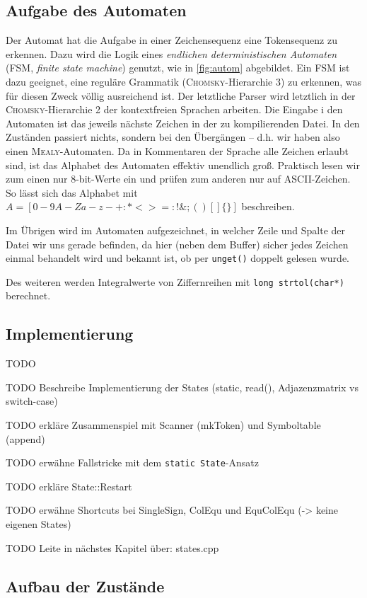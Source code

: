 \documentclass[
a4paper,   %
11pt,      %
oneside,   %
onecolumn, %
final      %
]{article}
\newcommand{\code}[1]{\lstinline$#1$}
\begin{document}
\subsection{Aufgabe des Automaten}
Der Automat hat die Aufgabe in einer Zeichensequenz eine Tokensequenz zu erkennen.
Dazu wird die Logik eines \emph{endlichen deterministischen Automaten} (FSM, \emph{finite state machine}) genutzt, wie in \ref{fig:autom} abgebildet.
Ein FSM ist dazu geeignet, eine reguläre Grammatik (\textsc{Chomsky}-Hierarchie 3) zu erkennen, was für diesen Zweck völlig ausreichend ist. Der letztliche Parser wird letztlich in der \textsc{Chomsky}-Hierarchie 2 der kontextfreien Sprachen arbeiten.
Die Eingabe i den Automaten ist das jeweils nächste Zeichen in der zu kompilierenden Datei.
In den Zuständen passiert nichts, sondern bei den Übergängen -- d.h. wir haben also einen \textsc{Mealy}-Automaten.
Da in Kommentaren der Sprache alle Zeichen erlaubt sind, ist das Alphabet des Automaten effektiv unendlich groß.
Praktisch lesen wir zum einen nur 8-bit-Werte ein und prüfen zum anderen nur auf ASCII-Zeichen.
So lässt sich das Alphabet mit $A = [0-9A-Za-z-+:*<>=:!\&;()[]\{\}]$ beschreiben.

Im Übrigen wird im Automaten aufgezeichnet, in welcher Zeile und Spalte der Datei wir uns gerade befinden, da hier (neben dem Buffer) sicher jedes Zeichen einmal behandelt wird und bekannt ist, ob per \code{unget()} doppelt gelesen wurde.

Des weiteren werden Integralwerte von Ziffernreihen mit \code{long strtol(char*)} berechnet.

\subsection{Implementierung}
TODO

TODO Beschreibe Implementierung der States (static, read(), Adjazenzmatrix vs switch-case)

TODO erkläre Zusammenspiel mit Scanner (mkToken) und Symboltable (append)

TODO erwähne Fallstricke mit dem \code{static State}-Ansatz

TODO erkläre State::Restart

TODO erwähne Shortcuts bei SingleSign, ColEqu und EquColEqu (-> keine eigenen States)

TODO Leite in nächstes Kapitel über: states.cpp

\subsection{Aufbau der Zustände}
\end{document}
